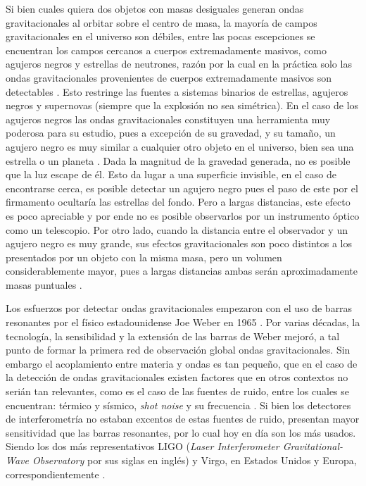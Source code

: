 	Si bien cuales quiera dos objetos con masas desiguales generan ondas gravitacionales al orbitar sobre el centro de masa, la mayor\'ia de campos gravitacionales en el universo son d\'ebiles, entre las pocas escepciones se encuentran los campos cercanos a cuerpos extremadamente masivos, como agujeros negros y estrellas de neutrones, raz\'on por la cual	en la pr\'actica solo las ondas gravitacionales provenientes de cuerpos extremadamente masivos son detectables \cite{straumann2012general}. Esto restringe las fuentes a sistemas binarios de estrellas, agujeros negros y supernovas (siempre que la explosi\'on no sea sim\'etrica). En el caso de los agujeros negros las ondas gravitacionales constituyen una herramienta muy poderosa para su estudio, pues a excepción de su gravedad, y su tamaño, un agujero negro es muy similar a cualquier otro objeto en el universo, bien sea una estrella o un planeta \cite{meier2012black}. Dada la magnitud de la gravedad generada, no es posible que la luz escape de él. Esto da lugar a una superficie invisible, en el caso de encontrarse cerca, es posible detectar un agujero negro pues el paso de este por el firmamento ocultar\'ia las estrellas del fondo. Pero a largas distancias, este efecto es poco apreciable y por ende no es posible observarlos por un instrumento \'optico como un telescopio. Por otro lado, cuando la distancia entre el observador y un agujero negro es muy grande, sus efectos gravitacionales son poco distintos a los presentados por un objeto con la misma masa, pero un volumen considerablemente mayor, pues a largas distancias ambas serán aproximadamente masas puntuales \cite{meier2012black}.
	
	Los esfuerzos por detectar ondas gravitacionales empezaron con el uso de barras resonantes por el f\'isico estadounidense Joe Weber en 1965 \cite{weber1967gravitational, bassan2014advanced}. Por varias d\'ecadas, la tecnolog\'ia, la sensibilidad y la extensi\'on de las barras de Weber mejor\'o, a tal punto de formar la primera red de observaci\'on global ondas gravitacionales. Sin embargo el acoplamiento entre materia y ondas es tan peque\~no, que en el caso de la detecci\'on de ondas gravitacionales existen factores que en otros contextos no seri\'an tan relevantes, como es el caso de las fuentes de ruido, entre los cuales se encuentran: t\'ermico y s\'ismico, \textit{shot noise} y su frecuencia \cite{bassan2014advanced}. Si bien los detectores de interferometr\'ia no estaban excentos de estas fuentes de ruido, presentan mayor sensitividad que las barras resonantes, por lo cual hoy en d\'ia son los m\'as usados. Siendo los dos m\'as representativos LIGO (\textit{Laser Interferometer Gravitational-Wave Observatory} por sus siglas en ingl\'es) y Virgo, en Estados Unidos y Europa, correspondientemente \cite{abbott2009ligo, acernese2008status, bassan2014advanced}.
	
